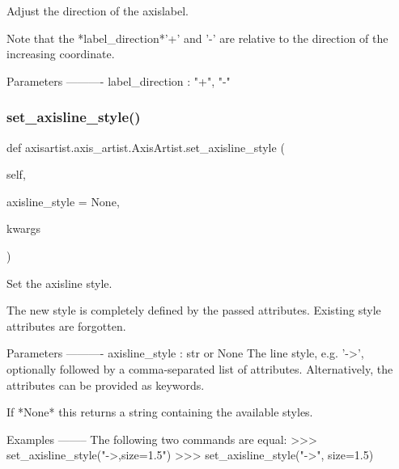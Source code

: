 \begin{DoxyVerb}Adjust the direction of the axislabel.

Note that the *label_direction*\s '+' and '-' are relative to the
direction of the increasing coordinate.

Parameters
----------
label_direction : {"+", "-"}
\end{DoxyVerb}
 \mbox{\label{classaxisartist_1_1axis__artist_1_1AxisArtist_a6621db864785e5109c9050c0da00c5d6}} 
\subsubsection{\texorpdfstring{set\+\_\+axisline\+\_\+style()}{set\_axisline\_style()}}
{\footnotesize\ttfamily def axisartist.\+axis\+\_\+artist.\+Axis\+Artist.\+set\+\_\+axisline\+\_\+style (\begin{DoxyParamCaption}\item[{}]{self,  }\item[{}]{axisline\+\_\+style = {\ttfamily None},  }\item[{}]{kwargs }\end{DoxyParamCaption})}

\begin{DoxyVerb}Set the axisline style.

The new style is completely defined by the passed attributes. Existing
style attributes are forgotten.

Parameters
----------
axisline_style : str or None
    The line style, e.g. '->', optionally followed by a comma-separated
    list of attributes. Alternatively, the attributes can be provided
    as keywords.

    If *None* this returns a string containing the available styles.

Examples
--------
The following two commands are equal:
>>> set_axisline_style("->,size=1.5")
>>> set_axisline_style("->", size=1.5)
\end{DoxyVerb}
 \mbox{\label{classaxisartist_1_1axis__artist_1_1AxisArtist_aafe2cbec638b167872ca487b6986c024}} 
